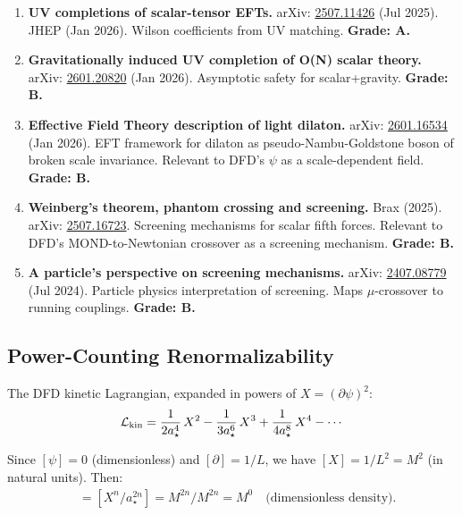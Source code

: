 \documentclass[11pt,a4paper]{article}
\begin{document}
\begin{enumerate}
\item \textbf{UV completions of scalar-tensor EFTs.} arXiv: \href{https://arxiv.org/abs/2507.11426}{2507.11426} (Jul 2025). JHEP (Jan 2026). Wilson coefficients from UV matching. \textbf{Grade: A.}

\item \textbf{Gravitationally induced UV completion of O(N) scalar theory.} arXiv: \href{https://arxiv.org/abs/2601.20820}{2601.20820} (Jan 2026). Asymptotic safety for scalar+gravity. \textbf{Grade: B.}

\item \textbf{Effective Field Theory description of light dilaton.} arXiv: \href{https://arxiv.org/abs/2601.16534}{2601.16534} (Jan 2026). EFT framework for dilaton as pseudo-Nambu-Goldstone boson of broken scale invariance. Relevant to DFD's $\psi$ as a scale-dependent field. \textbf{Grade: B.}

\item \textbf{Weinberg's theorem, phantom crossing and screening.} Brax (2025). arXiv: \href{https://arxiv.org/abs/2507.16723}{2507.16723}. Screening mechanisms for scalar fifth forces. Relevant to DFD's MOND-to-Newtonian crossover as a screening mechanism. \textbf{Grade: B.}

\item \textbf{A particle's perspective on screening mechanisms.} arXiv: \href{https://arxiv.org/abs/2407.08779}{2407.08779} (Jul 2024). Particle physics interpretation of screening. Maps $\mu$-crossover to running couplings. \textbf{Grade: B.}
\end{enumerate}

\subsection{Power-Counting Renormalizability}
\label{sec:power-counting}

The DFD kinetic Lagrangian, expanded in powers of $X = (\partial\psi)^2$:
\begin{equation}
\mathcal{L}_{\rm kin} = \frac{1}{2a_\star^4}\,X^2 - \frac{1}{3a_\star^6}\,X^3 + \frac{1}{4a_\star^8}\,X^4 - \cdots
\end{equation}

Since $[\psi] = 0$ (dimensionless) and $[\partial] = 1/L$, we have $[X] = 1/L^2 = M^2$ (in natural units). Then:
\begin{align}
[\mathcal{L}_{\rm kin}] &= [X^n/a_\star^{2n}] = M^{2n}/M^{2n} = M^0\quad\text{(dimensionless density)}.
\end{align}
\end{document}
